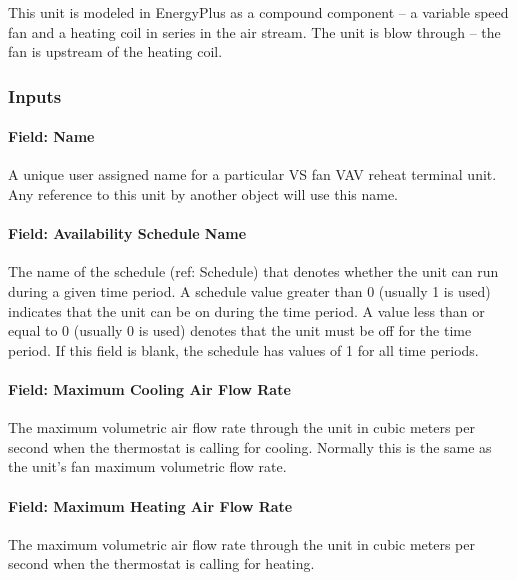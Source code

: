 This unit is modeled in EnergyPlus as a compound component -- a variable speed fan and a heating coil in series in the air stream. The unit is blow through -- the fan is upstream of the heating coil.

\subsubsection{Inputs}\label{inputs-3-000}

\paragraph{Field: Name}\label{field-name-3-000}

A unique user assigned name for a particular VS fan VAV reheat terminal unit. Any reference to this unit by another object will use this name.

\paragraph{Field: Availability Schedule Name}\label{field-availability-schedule-name-3}

The name of the schedule (ref: Schedule) that denotes whether the unit can run during a given time period. A schedule value greater than 0 (usually 1 is used) indicates that the unit can be on during the time period. A value less than or equal to 0 (usually 0 is used) denotes that the unit must be off for the time period. If this field is blank, the schedule has values of 1 for all time periods.

\paragraph{Field: Maximum Cooling Air Flow Rate}\label{field-maximum-cooling-air-flow-rate}

The maximum volumetric air flow rate through the unit in cubic meters per second when the thermostat is calling for cooling. Normally this is the same as the unit's fan maximum volumetric flow rate.

\paragraph{Field: Maximum Heating Air Flow Rate}\label{field-maximum-heating-air-flow-rate}

The maximum volumetric air flow rate through the unit in cubic meters per second when the thermostat is calling for heating.

